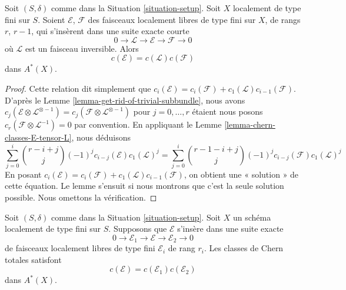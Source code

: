 \begin{lemma}
\label{lemma-additivity-invertible-subsheaf}
Soit $(S, \delta)$ comme dans la Situation \ref{situation-setup}.
Soit $X$ localement de type fini sur $S$.
Soient $\mathcal{E}$, $\mathcal{F}$ des faisceaux localement libres de type fini
sur $X$, de rangs $r$, $r - 1$, qui s'insèrent dans une suite
exacte courte
$$
0 \to \mathcal{L} \to \mathcal{E} \to \mathcal{F} \to 0
$$
où $\mathcal{L}$ est un faisceau inversible.
Alors
$$
c(\mathcal{E}) = c(\mathcal{L}) c(\mathcal{F})
$$
dans $A^*(X)$.
\end{lemma}

\begin{proof}
Cette relation dit simplement que
$c_i(\mathcal{E}) = c_i(\mathcal{F}) + c_1(\mathcal{L})c_{i - 1}(\mathcal{F})$.
D'après le Lemme \ref{lemma-get-rid-of-trivial-subbundle},
nous avons $c_j(\mathcal{E} \otimes \mathcal{L}^{\otimes -1})
= c_j(\mathcal{F} \otimes \mathcal{L}^{\otimes -1})$ pour
$j = 0, \ldots, r$ étaient nous posons
$c_r(\mathcal{F} \otimes \mathcal{L}^{-1}) = 0$ par convention.
En appliquant le Lemme \ref{lemma-chern-classes-E-tensor-L}, nous déduisons
$$
\sum_{j = 0}^i
\binom{r - i + j}{j} (-1)^j c_{i - j}({\mathcal E}) c_1({\mathcal L})^j
=
\sum_{j = 0}^i
\binom{r - 1 - i + j}{j} (-1)^j c_{i - j}({\mathcal F}) c_1({\mathcal L})^j
$$
En posant
$c_i(\mathcal{E}) = c_i(\mathcal{F}) + c_1(\mathcal{L})c_{i - 1}(\mathcal{F})$,
on obtient une « solution » de cette équation. Le lemme s'ensuit si nous montrons
que c'est la seule solution possible. Nous omettons la vérification.
\end{proof}

\begin{lemma}
\label{lemma-additivity-chern-classes}
Soit $(S, \delta)$ comme dans la Situation \ref{situation-setup}.
Soit $X$ un schéma localement de type fini sur $S$.
Supposons que ${\mathcal E}$ s'insère dans une
suite exacte
$$
0
\to
{\mathcal E}_1
\to
{\mathcal E}
\to
{\mathcal E}_2
\to
0
$$
de faisceaux localement libres de type fini $\mathcal{E}_i$ de rang $r_i$.
Les classes de Chern totales satisfont
$$
c({\mathcal E}) = c({\mathcal E}_1) c({\mathcal E}_2)
$$
dans $A^*(X)$.
\end{lemma}

